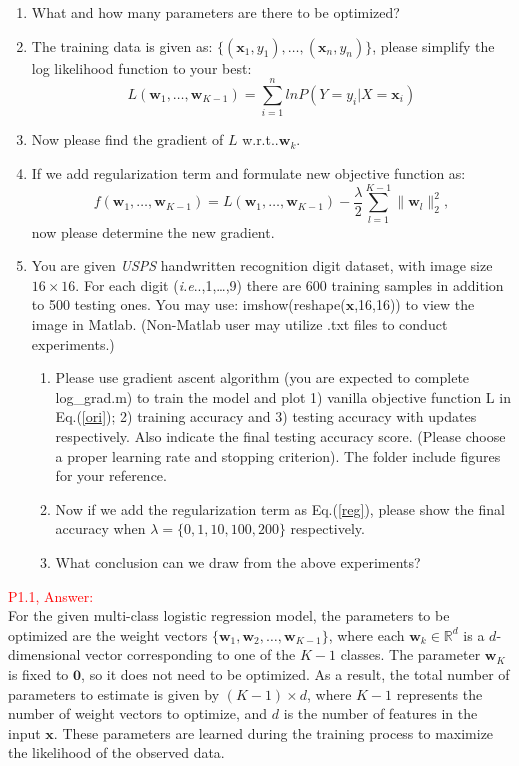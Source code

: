 \documentclass[11pt]{article}
\makeatletter
\newcommand{\vct}[1]{\mathbf{#1}}
\def \vw {\vct{w}}
\def \vx {\vct{x}}
\DeclareRobustCommand\onedot{\futurelet\@let@token\@onedot}
\def\@onedot{\ifx\@let@token.\else.\null\fi\xspace}
\def\ie{\emph{i.e}\onedot} \def\Ie{\emph{I.e}\onedot}
\def\wrt{w.r.t\onedot} \def\dof{d.o.f\onedot}
\makeatother
\begin{document}
\begin{enumerate}
	\item What and how many parameters are there to be optimized? 

	\item The training data is given as: $\{(\vx_1,y_1),\dots,(\vx_n,y_n)\}$, please simplify the log likelihood function to your best:
	\begin{equation}\label{ori}
		L(\vw_1,\dots,\vw_{K-1})=\sum\limits_{i=1}^n ln P(Y=y_i|X=\vx_i)
	\end{equation}
	\item Now please find the gradient of $L$ \wrt $\vw_k$.
	\item If we add regularization term and formulate new objective function as:
	\begin{equation}\label{reg}
		f(\vw_1,\dots,\vw_{K-1})=L(\vw_1,\dots,\vw_{K-1})-\frac{\lambda}{2}\sum\limits_{l=1}^{K-1}\|\vw_l\|^2_2,
	\end{equation}
	now please determine the new gradient.
	\item You are given \textit{USPS} handwritten recognition digit dataset, with image size $16 \times 16$. For each digit (\ie 0,1,\dots,9) there are 600 training samples in addition to 500 testing ones. You may use: imshow(reshape($\vx$,16,16)) to view the image in Matlab. (Non-Matlab user may utilize .txt files to conduct experiments.)
	\begin{enumerate}
		\item Please use gradient ascent algorithm (you are expected to complete log\_grad.m) to train the model and plot 1) vanilla objective function L in Eq.(\ref{ori}); 2) training accuracy and 3) testing accuracy with updates respectively. Also indicate the final testing accuracy score. (Please choose a proper learning rate and stopping criterion). The folder include figures for your reference. 
		\item Now if we add the regularization term as Eq.(\ref{reg}), please show the final accuracy when $\lambda=\{0,1,10,100,200\}$ respectively.
		\item What conclusion can we draw from the above experiments?
	\end{enumerate}
\end{enumerate}
\textcolor{red}{P1.1, Answer:}\\

For the given multi-class logistic regression model, the parameters to be optimized are the weight vectors 
\( \{\mathbf{w}_1, \mathbf{w}_2, \dots, \mathbf{w}_{K-1}\} \), where each \( \mathbf{w}_k \in \mathbb{R}^d \) is a \( d \)-dimensional 
vector corresponding to one of the \( K-1 \) classes. The parameter \( \mathbf{w}_K \) is fixed to \( \mathbf{0} \), 
so it does not need to be optimized. As a result, the total number of parameters to estimate is given by \( (K-1) \times d \), 
where \( K-1 \) represents the number of weight vectors to optimize, and \( d \) is the number of features in the input \( \mathbf{x} \). 
These parameters are learned during the training process to maximize the likelihood of the observed data.\\
\end{document}
